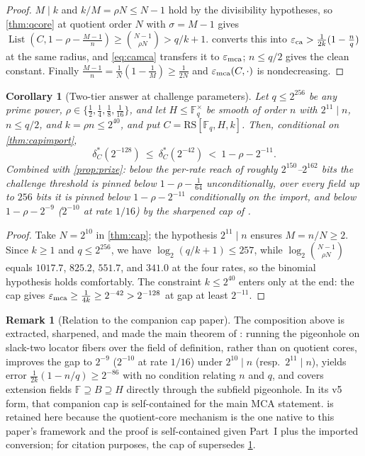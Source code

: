 \documentclass[11pt]{article}
\newtheorem{corollary}[corollary]{Corollary}
\theoremstyle{definition}
\newtheorem{remark}[remark]{Remark}
\newcommand{\F}{\mathbb F}
\newcommand{\eps}{\varepsilon}
\newcommand{\RS}{\mathrm{RS}}
\newcommand{\emca}{\eps_{\rm mca}}
\newcommand{\eca}{\eps_{\rm ca}}
\newcommand{\Lst}{\operatorname{List}}
\begin{document}
\begin{proof}
$M\mid k$ and $k/M=\rho N\le N-1$ hold by the divisibility hypotheses, so \cref{thm:qcore} at quotient order $N$ with $\sigma=M-1$ gives $\Lst(C,1-\rho-\frac{M-1}n)\ge\binom{N-1}{\rho N}>q/k+1$.   converts this into $\eca>\frac1{2k}(1-\frac nq)$ at the same radius, and \cref{eq:camca} transfers it to $\emca$; $n\le q/2$ gives the clean constant.  Finally $\frac{M-1}n=\frac1N(1-\frac1M)\ge\frac1{2N}$ and $\emca(C,\cdot)$ is nondecreasing.
\end{proof}

\begin{corollary}[Two-tier answer at challenge parameters]\label{cor:captiers}
Let $q\le2^{256}$ be any prime power, $\rho\in\{\frac12,\frac14,\frac18,\frac1{16}\}$, and let $H\le\F_q^\times$ be smooth of order $n$ with $2^{11}\mid n$, $n\le q/2$, and $k=\rho n\le2^{40}$, and put $C=\RS[\F_q,H,k]$.  Then, conditional on \cref{thm:capimport},
\[
        \delta^*_C(2^{-128})\ \le\ \delta^*_C(2^{-42})\ <\ 1-\rho-2^{-11}.
\]
Combined with \cref{prop:prize}: below the per-rate reach of roughly $2^{150}$--$2^{162}$ bits the challenge threshold is pinned below $1-\rho-\frac1{64}$ unconditionally, over every field up to $256$ bits it is pinned below $1-\rho-2^{-11}$ conditionally on the import, and below $1-\rho-2^{-9}$ ($2^{-10}$ at rate $1/16$) by the sharpened cap of \cite{UniversalCap}.
\end{corollary}

\begin{proof}
Take $N=2^{10}$ in \cref{thm:cap}; the hypothesis $2^{11}\mid n$ ensures $M=n/N\ge2$.  Since $k\ge1$ and $q\le2^{256}$, we have $\log_2(q/k+1)\le257$, while $\log_2\binom{N-1}{\rho N}$ equals $1017.7$, $825.2$, $551.7$, and $341.0$ at the four rates, so the binomial hypothesis holds comfortably.  The constraint $k\le2^{40}$ enters only at the end: the cap gives $\emca\ge\frac1{4k}\ge2^{-42}>2^{-128}$ at gap at least $2^{-11}$.
\end{proof}

\begin{remark}[Relation to the companion cap paper]\label{rem:capcompanion}
The composition above is extracted, sharpened, and made the main theorem of \cite{UniversalCap}: running the pigeonhole on slack-two locator fibers over the field of definition, rather than on quotient cores, improves the gap to $2^{-9}$ ($2^{-10}$ at rate $1/16$) under $2^{10}\mid n$ (resp.\ $2^{11}\mid n$), yields error $\frac1{2k}(1-n/q)\ge2^{-86}$ with no condition relating $n$ and $q$, and covers extension fields $\F\supseteq B\supseteq H$ directly through the subfield pigeonhole.  In its v5 form, that companion cap is self-contained for the main MCA statement.   is retained here because the quotient-core mechanism is the one native to this paper's framework and the proof is self-contained given Part~I plus the imported conversion; for citation purposes, the cap of \cite{UniversalCap} supersedes \cref{cor:captiers}.
\end{remark}
\end{document}
